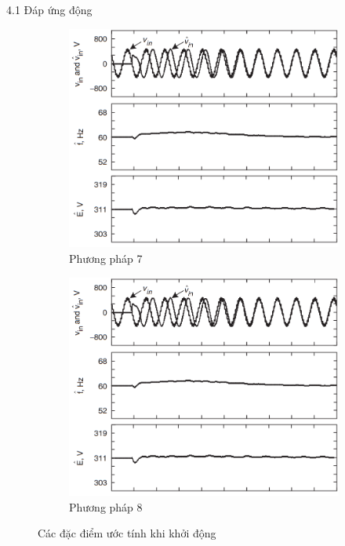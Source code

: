 \documentclass[11pt]{beamer}
\begin{document}
\begin{frame}[t]{4.1 Đáp ứng động}
	\begin{figure}
		\ContinuedFloat
		\begin{subfigure}{0.5\textwidth}
			\includegraphics[width=\linewidth]{fig12h}
			\caption{Phương pháp 7}
		\end{subfigure}%
		\begin{subfigure}{0.5\textwidth}
			\includegraphics[width=\linewidth]{fig12h}
			\caption{Phương pháp 8}
		\end{subfigure}
		\caption{Các đặc điểm ước tính khi khởi động}
	\end{figure}	
	
\end{frame}
\end{document}
